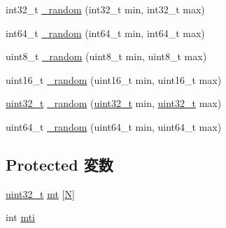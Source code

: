 \begin{DoxyCompactItemize}
\item 
int32\_\-t \hyperlink{classRandom_acd2b1e75098a84c5326b235ccd8da882}{\_\-random} (int32\_\-t min, int32\_\-t max)
\item 
int64\_\-t \hyperlink{classRandom_a5887d5ae0625ec51d34c6a43d59de941}{\_\-random} (int64\_\-t min, int64\_\-t max)
\item 
uint8\_\-t \hyperlink{classRandom_a0aef2bd382874c768a598ac67d8f0522}{\_\-random} (uint8\_\-t min, uint8\_\-t max)
\item 
uint16\_\-t \hyperlink{classRandom_a0d783614df02f847c8eeaef14a8d271c}{\_\-random} (uint16\_\-t min, uint16\_\-t max)
\item 
\hyperlink{Type_8hh_a435d1572bf3f880d55459d9805097f62}{uint32\_\-t} \hyperlink{classRandom_a65bcfbbebf2cf7c4240adf2683747838}{\_\-random} (\hyperlink{Type_8hh_a435d1572bf3f880d55459d9805097f62}{uint32\_\-t} min, \hyperlink{Type_8hh_a435d1572bf3f880d55459d9805097f62}{uint32\_\-t} max)
\item 
uint64\_\-t \hyperlink{classRandom_a05a49bba57cbef5cebd4d7d34e0d937d}{\_\-random} (uint64\_\-t min, uint64\_\-t max)
\end{DoxyCompactItemize}
\subsection*{Protected 変数}
\begin{DoxyCompactItemize}
\item 
\hyperlink{Type_8hh_a435d1572bf3f880d55459d9805097f62}{uint32\_\-t} \hyperlink{classRandom_a03c0530d5f0bb5fcc0162a33726528c8}{mt} \mbox{[}\hyperlink{classRandom_ab2b6b0c222cd1ce70d6a831f57241e59}{N}\mbox{]}
\item 
int \hyperlink{classRandom_a0893639c022032e006e5b13378f7b4b2}{mti}
\end{DoxyCompactItemize}
